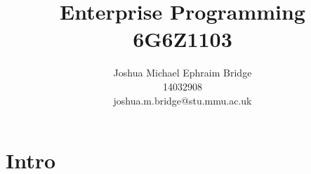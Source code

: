 \documentclass[12pt]{article}
\title{\vspace{2cm}\textbf{Enterprise Programming}\\6G6Z1103}
\author{Joshua Michael Ephraim Bridge\\14032908\\joshua.m.bridge@stu.mmu.ac.uk}
\begin{document}
\maketitle

\tableofcontents

\newpage

\section{Intro}

\newpage



\end{document}
